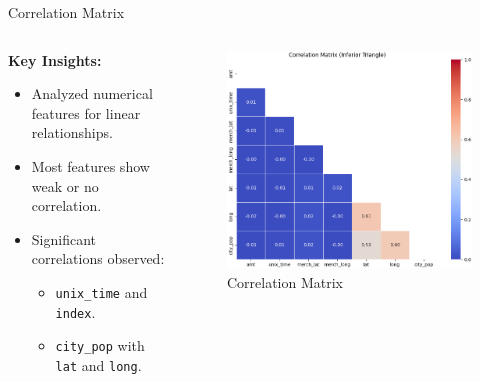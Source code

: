 \documentclass{beamer}
\begin{document}
\begin{frame}{Correlation Matrix}
    \begin{columns} %
        \begin{column}{0.5\textwidth}
            \textbf{Key Insights:}
            \begin{itemize}
                \item Analyzed numerical features for linear relationships.
                \item Most features show weak or no correlation.
                \item Significant correlations observed:
                \begin{itemize}
                    \item \texttt{unix\_time} and \texttt{index}.
                    \item \texttt{city\_pop} with \texttt{lat} and \texttt{long}.
                \end{itemize}
            \end{itemize}
        \end{column}
        
        \begin{column}{0.5\textwidth}
            \begin{figure}
                \centering
                \includegraphics[width=1\textwidth]{images/corr.png} %
                \caption{Correlation Matrix}
            \end{figure}
        \end{column}
    \end{columns}
\end{frame}
\end{document}
